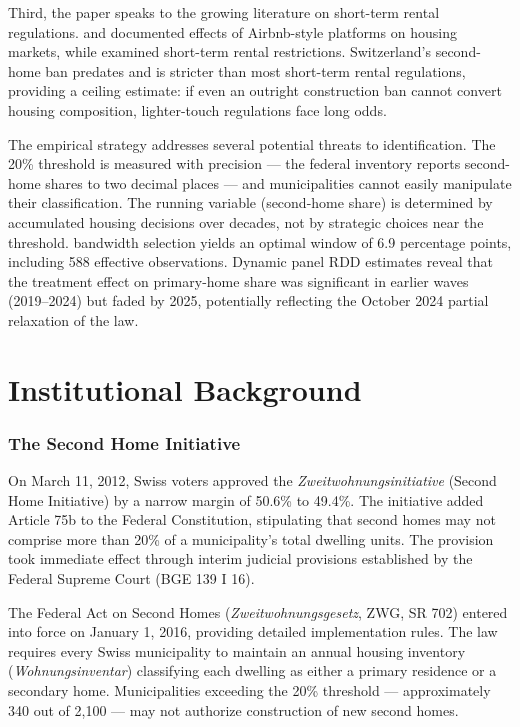 \documentclass[12pt]{article}
\begin{document}
Third, the paper speaks to the growing literature on short-term rental regulations. \citet{barron2021effect} and \citet{horn2017housing} documented effects of Airbnb-style platforms on housing markets, while \citet{garcia2020short} examined short-term rental restrictions. Switzerland's second-home ban predates and is stricter than most short-term rental regulations, providing a ceiling estimate: if even an outright construction ban cannot convert housing composition, lighter-touch regulations face long odds.

The empirical strategy addresses several potential threats to identification. The 20\% threshold is measured with precision --- the federal inventory reports second-home shares to two decimal places --- and municipalities cannot easily manipulate their classification. The running variable (second-home share) is determined by accumulated housing decisions over decades, not by strategic choices near the threshold. \citet{cattaneo2020practical} bandwidth selection yields an optimal window of 6.9 percentage points, including 588 effective observations. Dynamic panel RDD estimates reveal that the treatment effect on primary-home share was significant in earlier waves (2019--2024) but faded by 2025, potentially reflecting the October 2024 partial relaxation of the law.

\section{Institutional Background}

\subsubsection*{The Second Home Initiative} On March 11, 2012, Swiss voters approved the \textit{Zweitwohnungsinitiative} (Second Home Initiative) by a narrow margin of 50.6\% to 49.4\%. The initiative added Article 75b to the Federal Constitution, stipulating that second homes may not comprise more than 20\% of a municipality's total dwelling units. The provision took immediate effect through interim judicial provisions established by the Federal Supreme Court (BGE 139 I 16).

The Federal Act on Second Homes (\textit{Zweitwohnungsgesetz}, ZWG, SR 702) entered into force on January 1, 2016, providing detailed implementation rules. The law requires every Swiss municipality to maintain an annual housing inventory (\textit{Wohnungsinventar}) classifying each dwelling as either a primary residence or a secondary home. Municipalities exceeding the 20\% threshold --- approximately 340 out of 2,100 --- may not authorize construction of new second homes.
\end{document}
